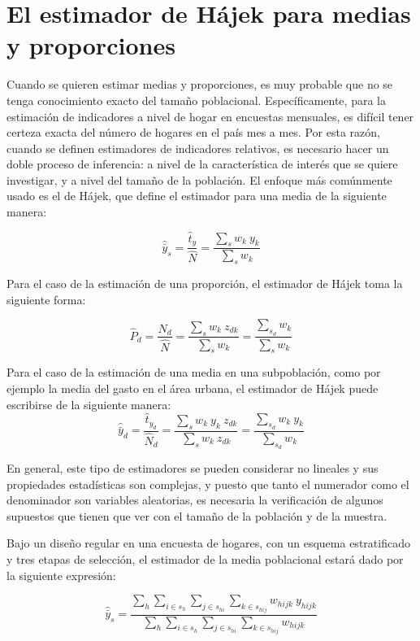 \documentclass[
  10pt,
  spanish,
]{book}
\begin{document}
\hypertarget{el-estimador-de-huxe1jek-para-medias-y-proporciones}{%
\section{El estimador de Hájek para medias y proporciones}\label{el-estimador-de-huxe1jek-para-medias-y-proporciones}}

Cuando se quieren estimar medias y proporciones, es muy probable que no se tenga conocimiento exacto del tamaño poblacional. Específicamente, para la estimación de indicadores a nivel de hogar en encuestas mensuales, es difícil tener certeza exacta del número de hogares en el país mes a mes. Por esta razón, cuando se definen estimadores de indicadores relativos, es necesario hacer un doble proceso de inferencia: a nivel de la característica de interés que se quiere investigar, y a nivel del tamaño de la población. El enfoque más comúnmente usado es el de Hájek, que define el estimador para una media de la siguiente manera:

\[
\hat{\bar{y}}_s=\frac{\hat t_y}{\hat N} = \frac{\sum_sw_k\ y_{k}}{\sum_sw_k}
\]

Para el caso de la estimación de una proporción, el estimador de Hájek toma la siguiente forma:

\[
\hat{P}_d=\frac{\hat N_d}{\hat N} = \frac{\sum_{s}w_k\ z_{dk}}{\sum_sw_k} = \frac{\sum_{s_d}w_k}{\sum_s w_k}
\]

Para el caso de la estimación de una media en una subpoblación, como por ejemplo la media del gasto en el área urbana, el estimador de Hájek puede escribirse de la siguiente manera:
\[
\hat{\bar{y}}_d=\frac{\hat t_{y_d}}{\hat N_d} = \frac{\sum_s w_k\ y_{k} \ z_{dk} }{\sum_s w_k \ z_{dk}} = \frac{\sum_{s_d} w_k\ y_{k}}{\sum_{s_d} w_k}
\]

En general, este tipo de estimadores se pueden considerar no lineales y sus propiedades estadísticas son complejas, y puesto que tanto el numerador como el denominador son variables aleatorias, es necesaria la verificación de algunos supuestos que tienen que ver con el tamaño de la población y de la muestra.

Bajo un diseño regular en una encuesta de hogares, con un esquema estratificado y tres etapas de selección, el estimador de la media poblacional estará dado por la siguiente expresión:

\[
\hat{\bar{y}}_s=\frac{\sum_h \sum_{i \in s_h} \sum_{j \in s_{hi}} \sum_{k \in s_{hij}} w_{hijk} \ y_{hijk}}{\sum_h \sum_{i \in s_h} \sum_{j \in s_{hi}} \sum_{k \in s_{hij}} w_{hijk} }
\]
\end{document}

